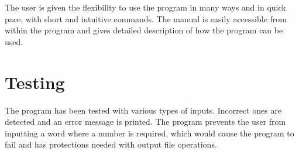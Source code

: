 \documentclass{article}
\begin{document}
The user is given the flexibility to use the program in many ways and in quick pace, with short and intuitive commands. The manual is easily accessible from within the program and gives detailed description of how the program can be used.

\section{Testing}

The program has been tested with various types of inputs. Incorrect ones are detected and an error message is printed. The program prevents the user from inputting a word where a number is required, which would cause the program to fail and has protections needed with output file operations.
\end{document}
